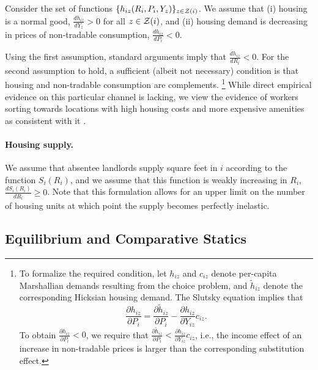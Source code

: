 \begin{assu}\label{assu:housing_demand}
    Consider the set of functions $\{h_{iz} (R_i, P_i, Y_z)\}_{z\in\mathcal{Z}(i)}$.
    We assume that
    (i) housing is a normal good, 
    $\frac{d h_{iz}}{d Y_z} > 0$ for all $z\in\mathcal{Z}(i)$,
    and
    (ii) housing demand is decreasing in prices of non-tradable consumption, 
    $\frac{d h_{iz}}{d P_i} < 0$.
\end{assu}

Using the first assumption, standard arguments imply that 
$\frac{d h_{iz}}{d R_i} < 0$.
For the second assumption to hold, 
a sufficient (albeit not necessary) condition is that housing and non-tradable
consumption are complements.%
\footnote{To formalize the required condition, let $h_{iz}$ and $c_{iz}$ denote 
per-capita Marshallian demands resulting from the choice problem, and 
$\tilde h_{iz}$ denote the corresponding Hicksian housing demand.
The Slutsky equation implies that
$$\frac{\partial h_{iz}}{\partial P_i}
   = \frac{\partial \tilde h_{iz}}{\partial P_i}
   - \frac{\partial h_{iz}}{\partial Y_{iz}} c_{iz}.$$
To obtain $\frac{\partial h_{iz}}{\partial P_i} < 0$, we require that
$\frac{\partial \tilde h_{iz}}{\partial P_i}
< \frac{\partial h_{iz}}{\partial Y_{iz}} c_{iz}$, i.e., the income effect of an
increase in non-tradable prices is larger than the corresponding substitution
effect.}
While direct empirical evidence on this particular channel is lacking,
we view the evidence of workers sorting towards locations with high housing 
costs and more expensive amenities as consistent with it 
\parencite[e.g.,][]{CoutureEtAl2019}.

\paragraph{Housing supply.}

We assume that absentee landlords supply square feet in $i$ according to the 
function $S_i(R_i)$,
and we assume that this function is weakly increasing in $R_i$, 
$\frac{d S_i(R_i)}{d R_i} \ge 0$.
Note that this formulation allows for an upper limit on the number of housing 
units at which point the supply becomes perfectly inelastic.


\subsection{Equilibrium and Comparative Statics}

